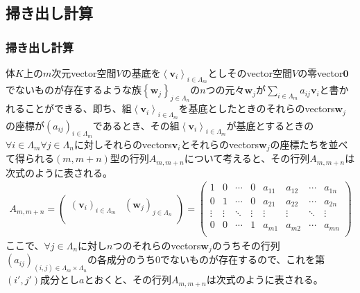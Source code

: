 \documentclass[dvipdfmx]{jsarticle}
\begin{document}
\subsection{掃き出し計算}%
\subsubsection{掃き出し計算}%
\begin{dfn}
体$K$上の$m$次元vector空間$V$の基底を$\left\langle \mathbf{v}_{i} \right\rangle_{i \in \varLambda_{m}}$としそのvector空間$V$の零vector$\mathbf{0}$でないものが存在するような族$\left\{ \mathbf{w}_{j}\right\}_{j \in \varLambda_{n}} $の$n$つの元々$\mathbf{w}_{j}$が$\sum_{i \in \varLambda_{m}} {a_{ij}\mathbf{v}_{i}}$と書かれることができる、即ち、組$\left\langle \mathbf{v}_{i} \right\rangle_{i \in \varLambda_{m}}$を基底としたときのそれらのvectors$\mathbf{w}_{j}$の座標が$\left( a_{ij} \right)_{i \in \varLambda_{m}}$であるとき、その組$\left\langle \mathbf{v}_{i} \right\rangle_{i \in \varLambda_{m}}$が基底とするときの$\forall i \in \varLambda_{m}\forall j \in \varLambda_{n}$に対しそれらのvectors$\mathbf{v}_{i}$とそれらのvectors$\mathbf{w}_{j}$の座標たちを並べて得られる$(m,m + n)$型の行列$A_{m,m + n}$について考えると、その行列$A_{m,m + n}$は次式のように表される。
\begin{align*}
A_{m,m + n} = \begin{pmatrix}
\left( \mathbf{v}_{i} \right)_{i \in \varLambda_{m}} & \left( \mathbf{w}_{j} \right)_{j \in \varLambda_{n}} \\
\end{pmatrix} = \begin{pmatrix}
1 & 0 & \cdots & 0 & a_{11} & a_{12} & \cdots & a_{1n} \\
0 & 1 & \cdots & 0 & a_{21} & a_{22} & \cdots & a_{2n} \\
 \vdots & \vdots & \ddots & \vdots & \vdots & \vdots & \ddots & \vdots \\
0 & 0 & \cdots & 1 & a_{m1} & a_{m2} & \cdots & a_{mn} \\
\end{pmatrix}
\end{align*}
ここで、$\forall j \in \varLambda_{n}$に対し$n$つのそれらのvectors$\mathbf{w}_{j}$のうちその行列$\left( a_{ij} \right)_{(i,j) \in \varLambda_{m} \times \varLambda_{n}}$の各成分のうち0でないものが存在するので、これを第$\left( i',j' \right)$成分とし$a$とおくと、その行列$A_{m,m + n}$は次式のように表される。

\end{dfn}
\end{document}
